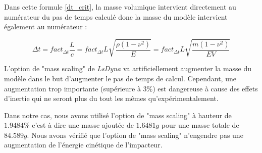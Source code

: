 \documentclass[a4paper]{article}
\begin{document}
	\hspace{0.5cm}Dans cette formule \ref{dt_crit}, la masse volumique intervient directement au numérateur du pas de temps calculé donc la masse du modèle intervient également au numérateur :
	
	$$\Delta t = fact_{\Delta t} \frac{L}{c} = fact_{\Delta t} L \sqrt{\frac{\rho (1 - \nu^{2})}{E}} = fact_{\Delta t} L \sqrt{\frac{m (1 - \nu^{2})}{EV}}$$
	\hspace{0.2cm}
	
	\hspace{0.5cm}L'option de "mass scaling" de \textit{LsDyna} va artificiellement augmenter la masse du modèle dans le but d'augmenter le pas de temps de calcul. Cependant, une augmentation trop importante (supérieure à $3\%$) est dangereuse à cause des effets d'inertie qui ne seront plus du tout les mêmes qu'expérimentalement.
	
	\hspace{0.5cm}Dans notre cas, nous avons utilisé l'option de "mass scaling" à hauteur de $1.9484\%$ c'est à dire une masse ajoutée de $1.6481g$ pour une masse totale de $84.589g$. Nous avons vérifié que l'option de "mass scaling" n'engendre pas une augmentation de l'énergie cinétique de l'impacteur.
	\newpage
	
\end{document}
